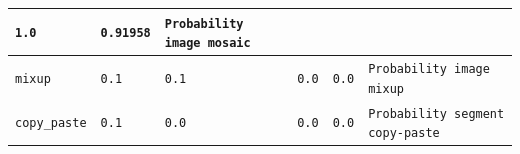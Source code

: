 \begin{table}
\begin{tabular}{ | m{7.5em} | m{4em} | m{4em} | 
 m{4em}| m{4em} | m{16em} |}
            \centering\texttt{1.0} & 
            \centering\texttt{0.91958} &
            \texttt{Probability image mosaic}
            \tabularnewline
        \hline
            \texttt{mixup} & 
            \centering\texttt{0.1} & 
            \centering\texttt{0.1} & 
            \centering\texttt{0.0} & 
            \centering\texttt{0.0} &
            \texttt{Probability image mixup}
            \tabularnewline
        \hline
            \texttt{copy\_paste} & 
            \centering\texttt{0.1} & 
            \centering\texttt{0.0} & 
            \centering\texttt{0.0} & 
            \centering\texttt{0.0} &
            \texttt{Probability segment copy-paste}
            \tabularnewline
        \hline
    \end{tabular}
    \label{table:Hyperparameters}
\end{table}
